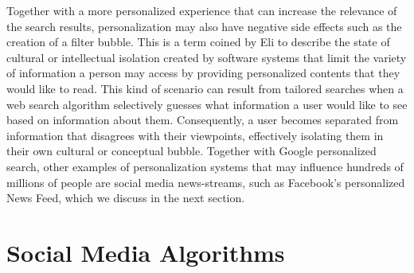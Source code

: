 Together with a more personalized experience that can increase the relevance of the search results, personalization may also have negative side effects such as the creation of a filter bubble. This is a term coined by Eli \citet{chap:05:Pariser:2011} to describe the state of cultural or intellectual isolation created by software systems that limit the variety of information a person may access by providing personalized contents that they would like to read. This kind of scenario can result from tailored searches when a web search algorithm selectively guesses what information a user would like to see based on information about them. Consequently, a user becomes separated from information that disagrees with their viewpoints, effectively isolating them in their own cultural or conceptual bubble. Together with Google \hbox{personalized} search, other examples of personalization systems that may influence hundreds of millions of people are social media news-streams, such as Facebook's personalized News Feed, which we discuss in the next section.


\section{\label{sec:5.3}Social Media Algorithms}


